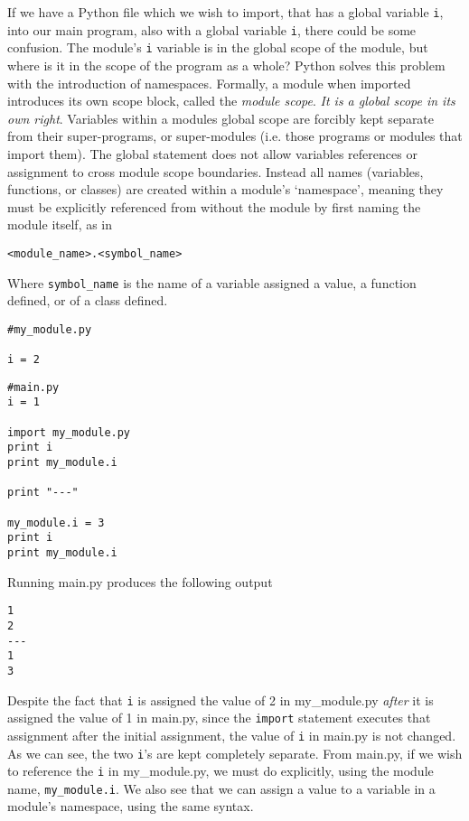 If we have a Python file which we wish to import, that has a global   variable \texttt{i}, into our main program, also with a global variable \texttt{i},   there could be some confusion. The module's \texttt{i} variable is in the   global scope of the module, but where is it in the scope of the program   as a whole? Python solves this problem with the introduction of   namespaces. Formally, a module when imported introduces its own scope   block, called the \textit{module scope}. \textit{It is a global scope in its own   right}.  Variables within a modules global scope are forcibly   kept separate from their super-programs, or super-modules (i.e. those   programs or modules that import them). The global statement does not   allow variables references or assignment to cross module scope   boundaries. Instead all names (variables, functions, or classes) are   created within a module's `namespace', meaning they must be explicitly   referenced from without the module by first naming the module itself,   as in
\begin{lstlisting}
<module_name>.<symbol_name>
\end{lstlisting}

Where \texttt{symbol\_name} is the name of a variable assigned a value, a function   defined, or of a class defined.
\begin{lstlisting}
#my_module.py

i = 2
\end{lstlisting}
\begin{lstlisting}
#main.py
i = 1

import my_module.py
print i
print my_module.i

print "---"

my_module.i = 3
print i
print my_module.i
\end{lstlisting}

Running main.py produces the following output
\begin{lstlisting}
1
2
---
1
3
\end{lstlisting}

Despite the fact that \texttt{i} is assigned the value of 2 in my\_module.py   \textit{after} it is assigned the value of 1 in main.py, since   the \texttt{import} statement executes that assignment after the initial   assignment, the value of \texttt{i} in main.py is not changed. As we can see,   the two \texttt{i}'s are kept completely separate. From main.py, if we wish to   reference the \texttt{i} in my\_module.py, we must do explicitly, using the   module name, 
\texttt{my\_module.i}. We also see that we can assign a   value to a variable in a module's namespace, using the same syntax.

